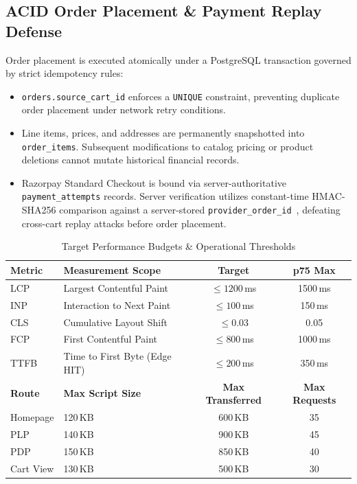 \documentclass[conference]{IEEEtran}
\begin{document}
\subsection{ACID Order Placement \& Payment Replay Defense}
Order placement is executed atomically under a PostgreSQL transaction governed by strict idempotency rules:
\begin{itemize}
    \item \texttt{orders.source\_cart\_id} enforces a \texttt{UNIQUE} constraint, preventing duplicate order placement under network retry conditions.
    \item Line items, prices, and addresses are permanently snapshotted into \texttt{order\_items}. Subsequent modifications to catalog pricing or product deletions cannot mutate historical financial records.
    \item Razorpay Standard Checkout is bound via server-authoritative \texttt{payment\_attempts} records. Server verification utilizes constant-time HMAC-SHA256 comparison against a server-stored \texttt{provider\_order\_id}~\cite{rfc2104hmac}, defeating cross-cart replay attacks before order placement.
\end{itemize}

\begin{table}[t]
\caption{Target Performance Budgets \& Operational Thresholds}
\label{tab:budgets}
\centering
\begin{tabular}{@{}llcc@{}}
\toprule
\textbf{Metric} & \textbf{Measurement Scope} & \textbf{Target} & \textbf{p75 Max} \\
\midrule
LCP & Largest Contentful Paint & $\le 1200$\,ms & 1500\,ms \\
INP & Interaction to Next Paint & $\le 100$\,ms & 150\,ms \\
CLS & Cumulative Layout Shift & $\le 0.03$ & 0.05 \\
FCP & First Contentful Paint & $\le 800$\,ms & 1000\,ms \\
TTFB & Time to First Byte (Edge HIT) & $\le 200$\,ms & 350\,ms \\
\midrule
\textbf{Route} & \textbf{Max Script Size} & \textbf{Max Transferred} & \textbf{Max Requests} \\
\midrule
Homepage & 120\,KB & 600\,KB & 35 \\
PLP & 140\,KB & 900\,KB & 45 \\
PDP & 150\,KB & 850\,KB & 40 \\
Cart View & 130\,KB & 500\,KB & 30 \\
\bottomrule
\end{tabular}
\end{table}
\end{document}
